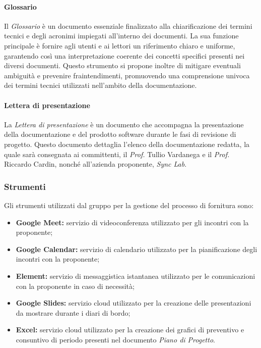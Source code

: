 \paragraph{Glossario}
Il \textit{Glossario} è un documento essenziale finalizzato alla chiarificazione dei termini tecnici e degli acronimi impiegati all'interno dei documenti. La sua funzione principale è fornire agli utenti e ai lettori un riferimento chiaro e uniforme, garantendo così una interpretazione coerente dei concetti specifici presenti nei diversi documenti. Questo strumento si propone inoltre di mitigare eventuali ambiguità e prevenire fraintendimenti, promuovendo una comprensione univoca dei termini tecnici utilizzati nell'ambito della documentazione.

\paragraph{Lettera di presentazione}
La \textit{Lettera di presentazione} è un documento che accompagna la presentazione della documentazione e del prodotto software durante le fasi di revisione di progetto. Questo documento dettaglia l'elenco della documentazione redatta, la quale sarà consegnata ai committenti, il \textit{Prof.} Tullio Vardanega e il \textit{Prof.} Riccardo Cardin, nonché all'azienda proponente, \textit{Sync Lab}.

\subsubsection{Strumenti}
Gli strumenti utilizzati dal gruppo per la gestione del processo di fornitura sono:
\begin{itemize}
    \item \textbf{Google Meet:}
    servizio di videoconferenza utilizzato per gli incontri con la proponente;
    \item \textbf{Google Calendar:}
    servizio di calendario utilizzato per la pianificazione degli incontri con la proponente;
    \item \textbf{Element:}
    servizio di messaggistica istantanea utilizzato per le comunicazioni con la proponente in caso di necessità;
    \item \textbf{Google Slides:}
    servizio cloud utilizzato per la creazione delle presentazioni da mostrare durante i diari di bordo;
    \item \textbf{Excel:} servizio cloud utilizzato per la creazione dei grafici di preventivo e consuntivo di periodo presenti nel documento \textit{Piano di Progetto}.
\end{itemize}

